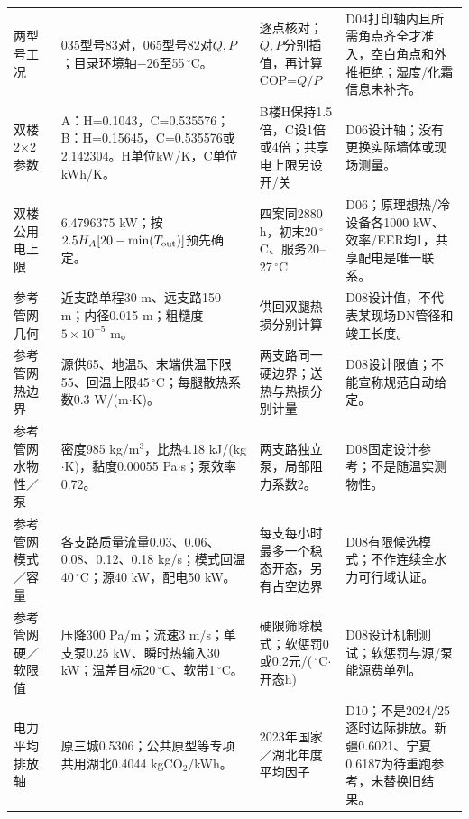\begin{longtable}{@{}L{0.16\textwidth}L{0.32\textwidth}L{0.23\textwidth}L{0.21\textwidth}@{}}
两型号工况 & 035型号83对，065型号82对$Q,P$；目录环境轴$-26$至55\,${}^{\circ}$C。 & 逐点核对；$Q,P$分别插值，再计算COP=$Q/P$ & D04打印轴内且所需角点齐全才准入，空白角点和外推拒绝；湿度/化霜信息未补齐。 \\
双楼2×2参数 & A：H=0.1043，C=0.535576；B：H=0.15645，C=0.535576或2.142304。H单位kW/K，C单位kWh/K。 & B楼H保持1.5倍，C设1倍或4倍；共享电上限另设开/关 & D06设计轴；没有更换实际墙体或现场测量。 \\
双楼公用电上限 & 6.4796375 kW；按$2.5H_A[20-\min(T_{\rm out})]$预先确定。 & 四案同2880 h，初末20\,${}^{\circ}$C、服务20--27\,${}^{\circ}$C & D06；原理想热/冷设备各1000 kW、效率/EER均1，共享配电是唯一联系。 \\
参考管网几何 & 近支路单程30 m、远支路150 m；内径0.015 m；粗糙度$5\times10^{-5}$ m。 & 供回双腿热损分别计算 & D08设计值，不代表某现场DN管径和竣工长度。 \\
参考管网热边界 & 源供65、地温5、末端供温下限55、回温上限45\,${}^{\circ}$C；每腿散热系数0.3 W/(m$\cdot$K)。 & 两支路同一硬边界；送热与热损分别计量 & D08设计限值；不能宣称规范自动给定。 \\
参考管网水物性／泵 & 密度985 kg/m$^3$，比热4.18 kJ/(kg$\cdot$K)，黏度0.00055 Pa$\cdot$s；泵效率0.72。 & 两支路独立泵，局部阻力系数2。 & D08固定设计参考；不是随温实测物性。 \\
参考管网模式／容量 & 各支路质量流量0.03、0.06、0.08、0.12、0.18 kg/s；模式回温40\,${}^{\circ}$C；源40 kW，配电50 kW。 & 每支每小时最多一个稳态开态，另有占空边界 & D08有限候选模式；不作连续全水力可行域认证。 \\
参考管网硬／软限值 & 压降300 Pa/m；流速3 m/s；单支泵0.25 kW、瞬时热输入30 kW；温差目标20\,${}^{\circ}$C、软带1\,${}^{\circ}$C。 & 硬限筛除模式；软惩罚0或0.2元/(\,${}^{\circ}$C$\cdot$开态h) & D08设计机制测试；软惩罚与源/泵能源费单列。 \\
电力平均排放轴 & 原三城0.5306；公共原型等专项共用湖北0.4044 kgCO$_2$/kWh。 & 2023年国家／湖北年度平均因子 & D10；不是2024/25逐时边际排放。新疆0.6021、宁夏0.6187为待重跑参考，未替换旧结果。 \\
\end{longtable}

